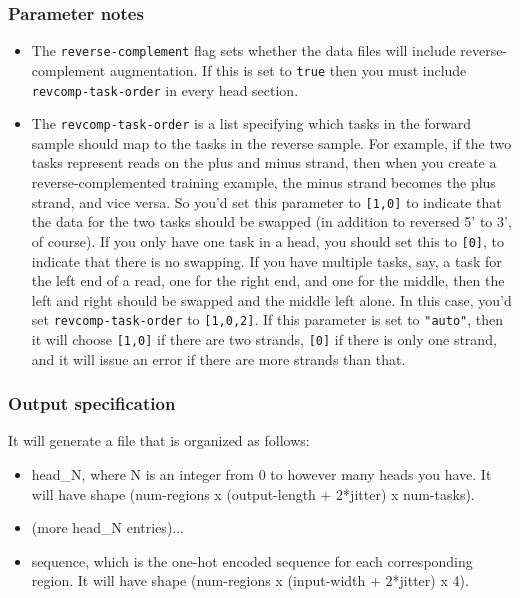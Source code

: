 \documentclass{article}
\begin{document}
\subsubsection{Parameter notes}
\begin{itemize}
    \item The \texttt{reverse-complement} flag sets whether the data files will include reverse-complement augmentation. If this is set to \texttt{true} then you must include \texttt{revcomp-task-order} in every head section.
    \item The \texttt{revcomp-task-order} is a list specifying which tasks in the forward sample should map to the tasks in the reverse sample. 
        For example, if the two tasks represent reads on the plus and minus strand, then when you create a reverse-complemented training example, the minus strand becomes the plus strand, and vice versa.
        So you'd set this parameter to \texttt{[1,0]} to indicate that the data for the two tasks should be swapped (in addition to reversed 5' to 3', of course). 
        If you only have one task in a head, you should set this to \texttt{[0]}, to indicate that there is no swapping. 
        If you have multiple tasks, say, a task for the left end of a read, one for the right end, and one for the middle, then the left and right should be swapped and the middle left alone. 
        In this case, you'd set \texttt{revcomp-task-order} to \texttt{[1,0,2]}.
        If this parameter is set to \texttt{"auto"}, then it will choose \texttt{[1,0]} if there are two strands, \texttt{[0]} if there is only one strand, and it will issue an error if there are more strands than that.
\end{itemize}

\subsubsection{Output specification}

It will generate a file that is organized as follows:

\begin{itemize}
    \item head\_N, where N is an integer from 0 to however many heads you have. It will have shape (num-regions x (output-length + 2*jitter) x num-tasks). 
    \item (more head\_N entries)...
    \item sequence, which is the one-hot encoded sequence for each corresponding region. It will have shape (num-regions x (input-width + 2*jitter) x 4). 
\end{itemize}
\end{document}

